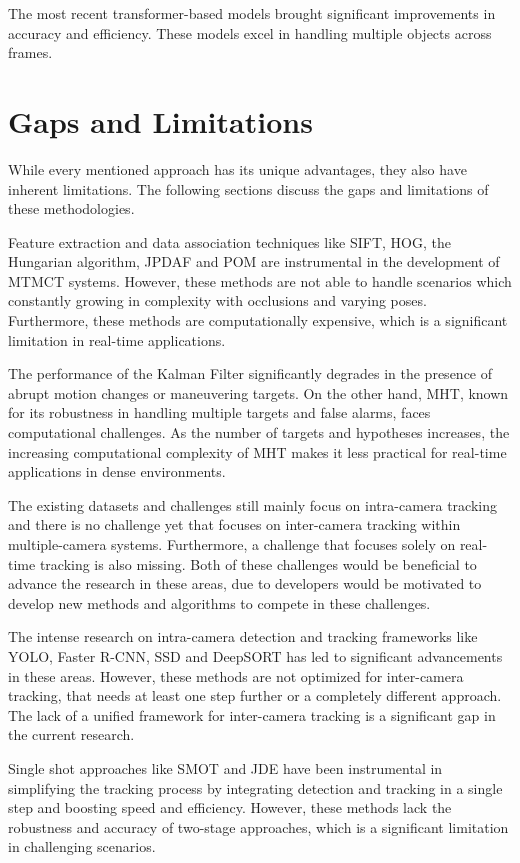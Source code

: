 The most recent transformer-based models brought significant improvements in accuracy and efficiency. These models excel in handling multiple objects across frames.

\section{Gaps and Limitations}\label{sec:gaps_and_limitations}
While every mentioned approach has its unique advantages, they also have inherent limitations. The following sections discuss the gaps and limitations of these methodologies.

Feature extraction and data association techniques like SIFT, HOG, the Hungarian algorithm, JPDAF and POM are instrumental in the development of MTMCT systems. However, these methods are not able to handle scenarios which constantly growing in complexity with occlusions and varying poses. Furthermore, these methods are computationally expensive, which is a significant limitation in real-time applications.

The performance of the Kalman Filter significantly degrades in the presence of abrupt motion changes or maneuvering targets. On the other hand, MHT, known for its robustness in handling multiple targets and false alarms, faces computational challenges. As the number of targets and hypotheses increases, the increasing computational complexity of MHT makes it less practical for real-time applications in dense environments.

The existing datasets and challenges still mainly focus on intra-camera tracking and there is no challenge yet that focuses on inter-camera tracking within multiple-camera systems. Furthermore, a challenge that focuses solely on real-time tracking is also missing. Both of these challenges would be beneficial to advance the research in these areas, due to developers would be motivated to develop new methods and algorithms to compete in these challenges.

The intense research on intra-camera detection and tracking frameworks like YOLO, Faster R-CNN, SSD and DeepSORT has led to significant advancements in these areas. However, these methods are not optimized for inter-camera tracking, that needs at least one step further or a completely different approach. The lack of a unified framework for inter-camera tracking is a significant gap in the current research.

Single shot approaches like SMOT and JDE have been instrumental in simplifying the tracking process by integrating detection and tracking in a single step and boosting speed and efficiency. However, these methods lack the robustness and accuracy of two-stage approaches, which is a significant limitation in challenging scenarios.

